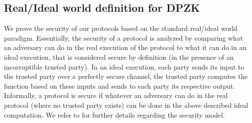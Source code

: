 \subsection{Real/Ideal world definition for DPZK}

We prove the security of our protocols based on the standard real/ideal world paradigm.  Essentially, the security of a protocol is analyzed by comparing what an adversary can do in the real execution of the protocol to what it can do in an ideal execution,  that is considered secure by definition (in the presence of an incorruptible trusted party). In an ideal execution, each party sends its input to the trusted party over a perfectly secure channel, the trusted party computes the function based on these inputs and sends to each party its respective output.  Informally, a protocol
is secure if whatever an adversary can do in the real protocol (where no trusted party exists) can be done in the above described ideal computation. We refer to \cite{Canetti00,Goldreich2001,Lindell17,CohenL14} for further details regarding the security model.  


